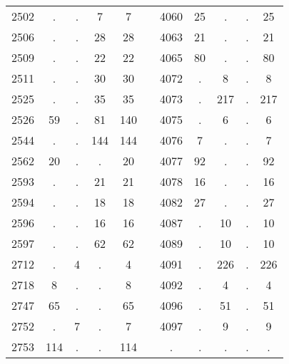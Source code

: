 \begin{tabular}{*{5}{c} C{.5cm} *{5}{c}}
 2502 & . & . & 7 & 7 && 4060 & 25 & . & . & 25 \\[3pt] 
 2506 & . & . & 28 & 28 && 4063 & 21 & . & . & 21 \\[3pt] 
 2509 & . & . & 22 & 22 && 4065 & 80 & . & . & 80 \\[3pt] 
 2511 & . & . & 30 & 30 && 4072 & . & 8 & . & 8 \\[3pt] 
 2525 & . & . & 35 & 35 && 4073 & . & 217 & . & 217 \\[3pt] 
 2526 & 59 & . & 81 & 140 && 4075 & . & 6 & . & 6 \\[3pt] 
 2544 & . & . & 144 & 144 && 4076 & 7 & . & . & 7 \\[3pt] 
 2562 & 20 & . & . & 20 && 4077 & 92 & . & . & 92 \\[3pt] 
 2593 & . & . & 21 & 21 && 4078 & 16 & . & . & 16 \\[3pt] 
 2594 & . & . & 18 & 18 && 4082 & 27 & . & . & 27 \\[3pt] 
 2596 & . & . & 16 & 16 && 4087 & . & 10 & . & 10 \\[3pt] 
 2597 & . & . & 62 & 62 && 4089 & . & 10 & . & 10 \\[3pt] 
 2712 & . & 4 & . & 4 && 4091 & . & 226 & . & 226 \\[3pt] 
 2718 & 8 & . & . & 8 && 4092 & . & 4 & . & 4 \\[3pt] 
 2747 & 65 & . & . & 65 && 4096 & . & 51 & . & 51 \\[3pt] 
 2752 & . & 7 & . & 7 && 4097 & . & 9 & . & 9 \\[3pt] 
 2753 & 114 & . & . & 114 && . & . & . & . & . \\[3pt] 
\hline
\end{tabular}
